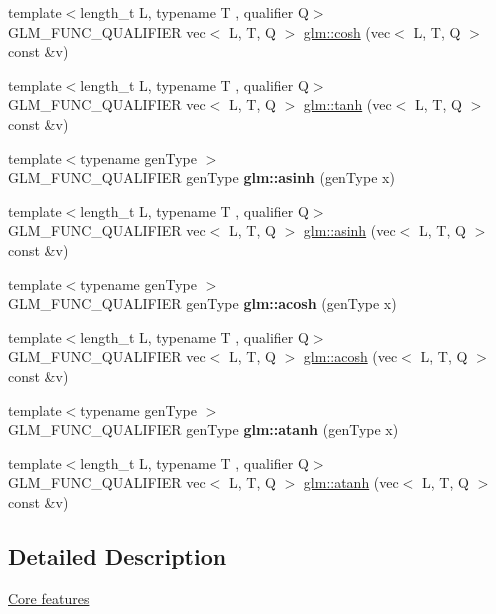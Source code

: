 \begin{DoxyCompactItemize}
{\footnotesize template$<$length\+\_\+t L, typename T , qualifier Q$>$ }\\G\+L\+M\+\_\+\+F\+U\+N\+C\+\_\+\+Q\+U\+A\+L\+I\+F\+I\+ER vec$<$ L, T, Q $>$ \hyperlink{group__core__func__trigonometric_ga4e260e372742c5f517aca196cf1e62b3}{glm\+::cosh} (vec$<$ L, T, Q $>$ const \&v)
\item 
{\footnotesize template$<$length\+\_\+t L, typename T , qualifier Q$>$ }\\G\+L\+M\+\_\+\+F\+U\+N\+C\+\_\+\+Q\+U\+A\+L\+I\+F\+I\+ER vec$<$ L, T, Q $>$ \hyperlink{group__core__func__trigonometric_gaa1bccbfdcbe40ed2ffcddc2aa8bfd0f1}{glm\+::tanh} (vec$<$ L, T, Q $>$ const \&v)
\item 
\mbox{\label{func__trigonometric_8inl_a95c8fa9b13f28e9bb3e232c67ad7e419}} 
{\footnotesize template$<$typename gen\+Type $>$ }\\G\+L\+M\+\_\+\+F\+U\+N\+C\+\_\+\+Q\+U\+A\+L\+I\+F\+I\+ER gen\+Type {\bfseries glm\+::asinh} (gen\+Type x)
\item 
{\footnotesize template$<$length\+\_\+t L, typename T , qualifier Q$>$ }\\G\+L\+M\+\_\+\+F\+U\+N\+C\+\_\+\+Q\+U\+A\+L\+I\+F\+I\+ER vec$<$ L, T, Q $>$ \hyperlink{group__core__func__trigonometric_ga3ef16b501ee859fddde88e22192a5950}{glm\+::asinh} (vec$<$ L, T, Q $>$ const \&v)
\item 
\mbox{\label{func__trigonometric_8inl_a68b59a562e15154aa2ef3bfb8f2348dc}} 
{\footnotesize template$<$typename gen\+Type $>$ }\\G\+L\+M\+\_\+\+F\+U\+N\+C\+\_\+\+Q\+U\+A\+L\+I\+F\+I\+ER gen\+Type {\bfseries glm\+::acosh} (gen\+Type x)
\item 
{\footnotesize template$<$length\+\_\+t L, typename T , qualifier Q$>$ }\\G\+L\+M\+\_\+\+F\+U\+N\+C\+\_\+\+Q\+U\+A\+L\+I\+F\+I\+ER vec$<$ L, T, Q $>$ \hyperlink{group__core__func__trigonometric_ga858f35dc66fd2688f20c52b5f25be76a}{glm\+::acosh} (vec$<$ L, T, Q $>$ const \&v)
\item 
\mbox{\label{func__trigonometric_8inl_a97f30482bc92e985c2da212b97d40f10}} 
{\footnotesize template$<$typename gen\+Type $>$ }\\G\+L\+M\+\_\+\+F\+U\+N\+C\+\_\+\+Q\+U\+A\+L\+I\+F\+I\+ER gen\+Type {\bfseries glm\+::atanh} (gen\+Type x)
\item 
{\footnotesize template$<$length\+\_\+t L, typename T , qualifier Q$>$ }\\G\+L\+M\+\_\+\+F\+U\+N\+C\+\_\+\+Q\+U\+A\+L\+I\+F\+I\+ER vec$<$ L, T, Q $>$ \hyperlink{group__core__func__trigonometric_gabc925650e618357d07da255531658b87}{glm\+::atanh} (vec$<$ L, T, Q $>$ const \&v)
\end{DoxyCompactItemize}


\subsection{Detailed Description}
\hyperlink{group__core}{Core features} 
